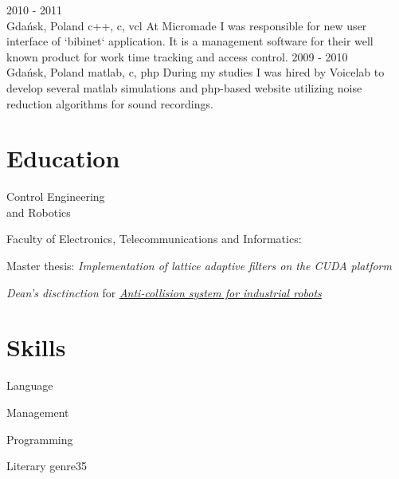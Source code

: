 \documentclass[a4paper,11pt]{cv4tw}%
\begin{document}
      {2010 - 2011\\Gdańsk, Poland}
      {c++, c, vcl}
      {At Micromade I was responsible for new user interface of `bibinet` application.
        It is a management software for their well known product for work time
        tracking and access control.
      }
      {2009 - 2010\\Gdańsk, Poland}
      {matlab, c, php}
      {During my studies I was hired by Voicelab to develop several matlab simulations
        and php-based website utilizing noise reduction algorithms for sound recordings.
      }
\section{Education}
      {Control Engineering\\and Robotics}
      {Faculty of Electronics, Telecommunications and Informatics:
        \begin{missions}
          \item Master thesis: \textit{Implementation of lattice adaptive filters on the CUDA platform}
          \item \emph{Dean's disctinction} for
            \href{https://projektgrupowy.eti.pg.gda.pl/editions/2/projects/496/posters/138}
                 {\itshape Anti-collision system for industrial robots}
        \end{missions}
      }
\section{Skills}
\begin{skills} {Language}
\end{skills}
\begin{skills}{Management}
\end{skills}
\begin{skills}{Programming}
\end{skills}
\begin{fields}{Literary genre}{3}{5}
\end{fields}

\end{document}

